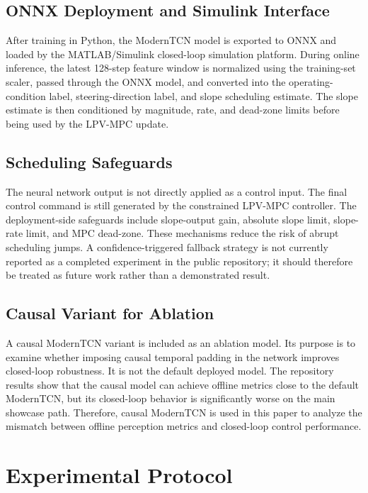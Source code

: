 \documentclass{ieeeaccess}
\begin{document}
\subsection{ONNX Deployment and Simulink Interface}

After training in Python, the ModernTCN model is exported to ONNX and loaded by the MATLAB/Simulink closed-loop simulation platform. During online inference, the latest 128-step feature window is normalized using the training-set scaler, passed through the ONNX model, and converted into the operating-condition label, steering-direction label, and slope scheduling estimate. The slope estimate is then conditioned by magnitude, rate, and dead-zone limits before being used by the LPV-MPC update.

\subsection{Scheduling Safeguards}

The neural network output is not directly applied as a control input. The final control command is still generated by the constrained LPV-MPC controller. The deployment-side safeguards include slope-output gain, absolute slope limit, slope-rate limit, and MPC dead-zone. These mechanisms reduce the risk of abrupt scheduling jumps. A confidence-triggered fallback strategy is not currently reported as a completed experiment in the public repository; it should therefore be treated as future work rather than a demonstrated result.

\subsection{Causal Variant for Ablation}

A causal ModernTCN variant is included as an ablation model. Its purpose is to examine whether imposing causal temporal padding in the network improves closed-loop robustness. It is not the default deployed model. The repository results show that the causal model can achieve offline metrics close to the default ModernTCN, but its closed-loop behavior is significantly worse on the main showcase path. Therefore, causal ModernTCN is used in this paper to analyze the mismatch between offline perception metrics and closed-loop control performance.

\section{Experimental Protocol}
\end{document}
